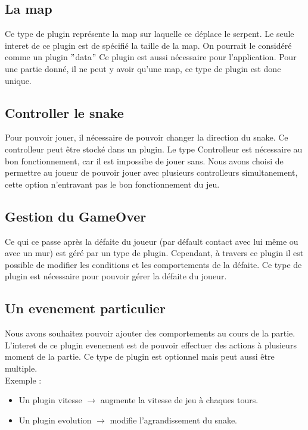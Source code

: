 \documentclass[12pt,a4paper]{article}
\begin{document}
    \subsection{ La map}
    
    Ce type de plugin représente la map sur laquelle ce déplace le serpent. Le seule interet de ce plugin est de spécifié la taille de la map. On pourrait le considéré comme un plugin $"$data$"$ Ce plugin est aussi nécessaire pour l'application. Pour une partie donné, il ne peut y avoir qu'une map, ce type de plugin est donc unique.
    
    \subsection{ Controller le snake}
    
    Pour pouvoir jouer, il nécessaire de pouvoir changer la direction du snake. Ce controlleur peut être stocké dans un plugin. Le type Controlleur est nécessaire au bon fonctionnement, car il est impossibe de jouer sans. Nous avons choisi de permettre au joueur de pouvoir jouer avec plusieurs controlleurs simultanement, cette option n'entravant pas le bon fonctionnement du jeu.    
    
\newpage    
    \subsection{ Gestion du GameOver}
    
    Ce qui ce passe après la défaite du joueur (par défault contact avec lui même ou avec un mur) est géré par un type de plugin. Cependant, à travers ce plugin il est possible de modifier les conditions et les comportements de la défaite. Ce type de plugin est nécessaire pour pouvoir gérer la défaite du joueur.
    
    \subsection{ Un evenement particulier}
    
    Nous avons souhaitez pouvoir ajouter des comportements au cours de la partie. L'interet de ce plugin evenement est de pouvoir effectuer des actions à plusieurs moment de la partie. Ce type de plugin est optionnel mais peut aussi être multiple.\\
            Exemple : 
    \begin{itemize}
        \item Un plugin vitesse $\rightarrow$ augmente la vitesse de jeu à chaques tours.
        \item Un plugin evolution $\rightarrow$ modifie l'agrandissement du snake.    
    \end{itemize}
    
    
    
\end{document}
